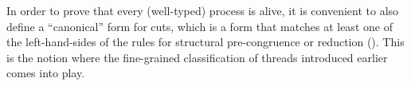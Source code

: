 In order to prove that every (well-typed) process is alive, it is convenient to
also define a ``canonical'' form for cuts, which is a form that matches at least
one of the left-hand-sides of the rules for structural pre-congruence or
reduction (). This is the notion where the fine-grained
classification of threads introduced earlier comes into play.

\begin{code}%
\>[0]\AgdaSpace{}%
\AgdaSpace{}%
\AgdaSymbol{\{}\AgdaSymbol{\}}\AgdaSpace{}%
\AgdaSymbol{:}\AgdaSpace{}%
\AgdaSpace{}%
\AgdaSpace{}%
\AgdaSpace{}%
\AgdaSpace{}%
\<%
\\
\>[0][@{}l@{\AgdaIndent{0}}]%
\>[2]\AgdaSpace{}%
\AgdaSymbol{:}\<%
\\
\>[2][@{}l@{\AgdaIndent{0}}]%
\>[4]\AgdaSpace{}%
\AgdaSpace{}%
\AgdaSpace{}%
\AgdaSymbol{\}}\AgdaSpace{}%
\AgdaSymbol{(}\AgdaSpace{}%
\AgdaSymbol{:}\AgdaSpace{}%
\AgdaSpace{}%
\AgdaSpace{}%
\AgdaSymbol{)}\AgdaSpace{}%
\AgdaSymbol{(}\AgdaSpace{}%
\AgdaSymbol{:}\AgdaSpace{}%
\AgdaSpace{}%
\AgdaSpace{}%
\AgdaSpace{}%
\AgdaOperator{\AgdaDatatype{+}}\AgdaSpace{}%
\AgdaSymbol{)}\<%
\\
%
\>[4]\AgdaSymbol{\{}\AgdaSpace{}%
\AgdaSymbol{:}\AgdaSpace{}%
\AgdaSpace{}%
\AgdaSymbol{(}\AgdaSpace{}%
\AgdaSpace{}%
\AgdaSymbol{)\}}\AgdaSpace{}%
\AgdaSymbol{\{}\AgdaSpace{}%
\AgdaSymbol{:}\AgdaSpace{}%
\AgdaSpace{}%
\AgdaSymbol{(}\AgdaSpace{}%
\AgdaSpace{}%
\AgdaSymbol{)\}}\AgdaSpace{}%
\<%
\\
%
\>[4]\AgdaSpace{}%
\AgdaSpace{}%
\AgdaSpace{}%
\AgdaSpace{}%
\AgdaSymbol{(}\AgdaSpace{}%
\AgdaSpace{}%
\AgdaSpace{}%
\AgdaSpace{}%
\AgdaSymbol{)}\<%
\\
%
\>[2]\AgdaSpace{}%
\AgdaSymbol{:}\<%
\\

\end{code}
